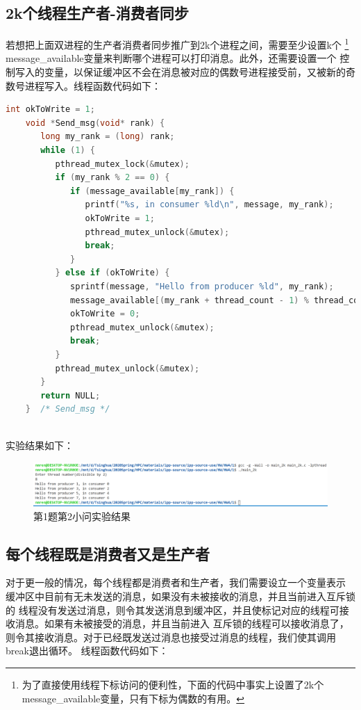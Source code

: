 \documentclass[UTF8]{article}
\begin{document}
\subsection{2k个线程生产者-消费者同步}
若想把上面双进程的生产者消费者同步推广到2k个进程之间，需要至少设置k个
\footnote{为了直接使用线程下标访问的便利性，下面的代码中事实上设置了2k个message\_available变量，只有下标为偶数的有用。}
message\_available变量来判断哪个进程可以打印消息。此外，还需要设置一个
控制写入的变量，以保证缓冲区不会在消息被对应的偶数号进程接受前，又被新的奇数号进程写入。线程函数代码如下：
\begin{lstlisting}[language={c}]
    int okToWrite = 1;
    void *Send_msg(void* rank) {
       long my_rank = (long) rank;
       while (1) {
          pthread_mutex_lock(&mutex);
          if (my_rank % 2 == 0) {
             if (message_available[my_rank]) {
                printf("%s, in consumer %ld\n", message, my_rank);
                okToWrite = 1;
                pthread_mutex_unlock(&mutex);
                break;
             }
          } else if (okToWrite) {
             sprintf(message, "Hello from producer %ld", my_rank);
             message_available[(my_rank + thread_count - 1) % thread_count] = 1;
             okToWrite = 0;
             pthread_mutex_unlock(&mutex);
             break;
          }
          pthread_mutex_unlock(&mutex);
       }
       return NULL;
    }  /* Send_msg */
    
    \end{lstlisting}

    实验结果如下：
    \begin{figure}[h]
        \centering
            \includegraphics[width=\textwidth]{12k.png}
            \caption{第1题第2小问实验结果}
        \end{figure}


\subsection{每个线程既是消费者又是生产者}
对于更一般的情况，每个线程都是消费者和生产者，我们需要设立一个变量表示
缓冲区中目前有无未发送的消息，如果没有未被接收的消息，并且当前进入互斥锁的
线程没有发送过消息，则令其发送消息到缓冲区，并且使标记对应的线程可接收消息。如果有未被接受的消息，并且当前进入
互斥锁的线程可以接收消息了，则令其接收消息。对于已经既发送过消息也接受过消息的线程，我们使其调用break退出循环。
线程函数代码如下：
\end{document}
